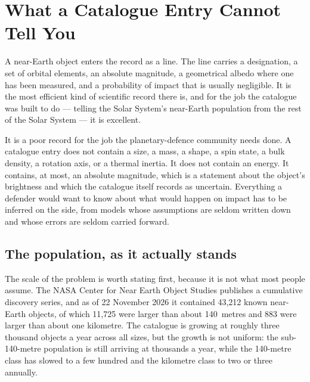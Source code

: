 
\chapter{What a Catalogue Entry Cannot Tell You}
\label{ch:catalogue-entry}

A near-Earth object enters the record as a line. The line carries a
designation, a set of orbital elements, an absolute magnitude, a geometrical
albedo where one has been measured, and a probability of impact that is usually
negligible. It is the most efficient kind of scientific record there is, and
for the job the catalogue was built to do --- telling the Solar System's
near-Earth population from the rest of the Solar System --- it is excellent.

It is a poor record for the job the planetary-defence community needs done.
A catalogue entry does not contain a size, a mass, a shape, a spin state, a
bulk density, a rotation axis, or a thermal inertia. It does not contain an
energy. It contains, at most, an absolute magnitude, which is a statement
about the object's brightness and which the catalogue itself records as
uncertain. Everything a defender would want to know about what would happen
on impact has to be inferred on the side, from models whose assumptions are
seldom written down and whose errors are seldom carried forward.

\section{The population, as it actually stands}

The scale of the problem is worth stating first, because it is not what most
people assume. The NASA Center for Near Earth Object Studies publishes a
cumulative discovery series, and as of 22 November 2026 it contained
43,212 known near-Earth objects, of which 11,725 were larger than about
140~metres and 883 were larger than about one kilometre. The catalogue is
growing at roughly three thousand objects a year across all sizes, but the
growth is not uniform: the sub-140-metre population is still arriving at
thousands a year, while the 140-metre class has slowed to a few hundred and
the kilometre class to two or three annually.

